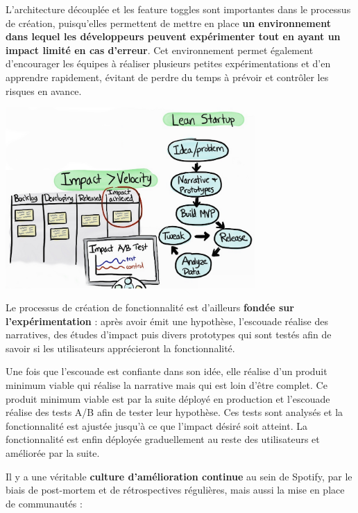 L'architecture découplée et les feature toggles sont importantes dans le processus de création, puisqu'elles permettent de mettre en place \textbf{un environnement dans lequel les développeurs peuvent expérimenter tout en ayant un impact limité en cas d'erreur}. Cet environnement permet également d'encourager les équipes à réaliser plusieurs petites expérimentations et d'en apprendre rapidement, évitant de perdre du temps à prévoir et contrôler les risques en avance.

\newpage

\begin{center}
\includegraphics[width=95mm]{./images_spotify/image04}
\end{center}

Le processus de création de fonctionnalité est d'ailleurs \textbf{fondée sur l'expérimentation} : après avoir émit une hypothèse, l'escouade réalise des narratives, des études d'impact puis divers prototypes qui sont testés afin de savoir si les utilisateurs apprécieront la fonctionnalité.

Une fois que l'escouade est confiante dans son idée, elle réalise d’un produit minimum viable qui réalise la narrative mais qui est loin d’être complet. Ce produit minimum viable est par la suite déployé en production et l'escouade réalise des tests A/B afin de tester leur hypothèse. Ces tests sont analysés et la fonctionnalité est ajustée jusqu'à ce que l'impact désiré soit atteint. La fonctionnalité est enfin déployée graduellement au reste des utilisateurs et améliorée par la suite. 

\vspace{5mm}

Il y a une véritable \textbf{culture d'amélioration continue} au sein de Spotify, par le biais de post-mortem et de rétrospectives régulières, mais aussi la mise en place de communautés : 

